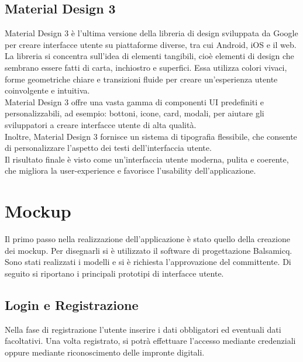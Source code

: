\documentclass[a4paper,final,12pt]{report}
\begin{document}
 \subsection{Material Design 3}
Material Design 3 è l'ultima versione della libreria di design sviluppata da Google per creare interfacce utente su piattaforme diverse, tra cui Android, iOS e il web.\\
La libreria si concentra sull'idea di elementi tangibili, cioè elementi di design che sembrano essere fatti di carta, inchiostro e superfici. Essa utilizza colori vivaci, forme geometriche chiare e transizioni fluide per creare un'esperienza utente coinvolgente e intuitiva.\\
Material Design 3 offre una vasta gamma di componenti UI predefiniti e personalizzabili, ad esempio: bottoni, icone, card, modali, per aiutare gli sviluppatori a creare interfacce utente di alta qualità.\\
Inoltre, Material Design 3 fornisce un sistema di tipografia flessibile, che consente di personalizzare l'aspetto dei testi dell'interfaccia utente.\\
Il risultato finale è visto come un'interfaccia utente moderna, pulita e coerente, che migliora la user-experience e favorisce l'usability dell'applicazione.

\section{Mockup}
Il primo passo nella realizzazione dell'applicazione è stato quello della creazione dei mockup. Per disegnarli si è utilizzato il software di progettazione Balsamicq. Sono stati realizzati i modelli e si è richiesta l'approvazione del committente. Di seguito si riportano i principali prototipi di interfacce utente.

\subsection{Login e Registrazione}
Nella fase di registrazione l'utente inserire i dati obbligatori ed eventuali dati facoltativi. Una volta registrato, si potrà effettuare l'accesso mediante credenziali oppure mediante riconoscimento delle impronte digitali.
\end{document}
